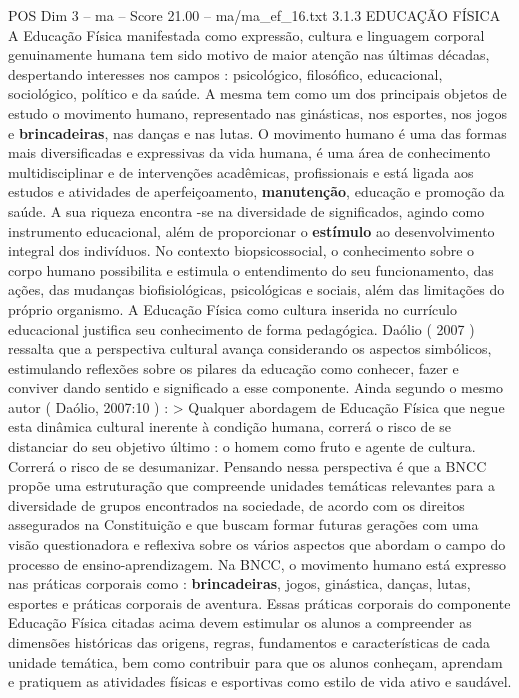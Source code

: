 \begin{textsample}{POS Dim 3 – ma – Score 21.00 – ma/ma\_ef\_16.txt}  \label{ex:f3_pos_144}
3.1.3 EDUCAÇÃO FÍSICA A Educação Física manifestada como expressão, cultura e linguagem corporal genuinamente humana tem sido motivo de maior atenção nas últimas décadas, despertando interesses nos campos : psicológico, filosófico, educacional, sociológico, político e da saúde.
A mesma tem como um dos principais objetos de estudo o movimento humano, representado nas ginásticas, nos esportes, nos jogos e \textbf{brincadeiras}, nas danças e nas lutas.
O movimento humano é uma das formas mais diversificadas e expressivas da vida humana, é uma área de conhecimento multidisciplinar e de intervenções acadêmicas, profissionais e está ligada aos estudos e atividades de aperfeiçoamento, \textbf{manutenção}, educação e promoção da saúde.
A sua riqueza encontra -se na diversidade de significados, agindo como instrumento educacional, além de proporcionar o \textbf{estímulo} ao desenvolvimento integral dos indivíduos.
No contexto biopsicossocial, o conhecimento sobre o corpo humano possibilita e estimula o entendimento do seu funcionamento, das ações, das mudanças biofisiológicas, psicológicas e sociais, além das limitações do próprio organismo.
A Educação Física como cultura inserida no currículo educacional justifica seu conhecimento de forma pedagógica.
Daólio ( 2007 ) ressalta que a perspectiva cultural avança considerando os aspectos simbólicos, estimulando reflexões sobre os pilares da educação como conhecer, fazer e conviver dando sentido e significado a esse componente.
Ainda segundo o mesmo autor ( Daólio, 2007:10 ) : > Qualquer abordagem de Educação Física que negue esta dinâmica cultural inerente à condição humana, correrá o risco de se distanciar do seu objetivo último : o homem como fruto e agente de cultura.
Correrá o risco de se desumanizar.
Pensando nessa perspectiva é que a BNCC propõe uma estruturação que compreende unidades temáticas relevantes para a diversidade de grupos encontrados na sociedade, de acordo com os direitos assegurados na Constituição e que buscam formar futuras gerações com uma visão questionadora e reflexiva sobre os vários aspectos que abordam o campo do processo de ensino-aprendizagem.
Na BNCC, o movimento humano está expresso nas práticas corporais como : \textbf{brincadeiras}, jogos, ginástica, danças, lutas, esportes e práticas corporais de aventura.
Essas práticas corporais do componente Educação Física citadas acima devem estimular os alunos a compreender as dimensões históricas das origens, regras, fundamentos e características de cada unidade temática, bem como contribuir para que os alunos conheçam, aprendam e pratiquem as atividades físicas e esportivas como estilo de vida ativo e saudável.

\end{textsample}
